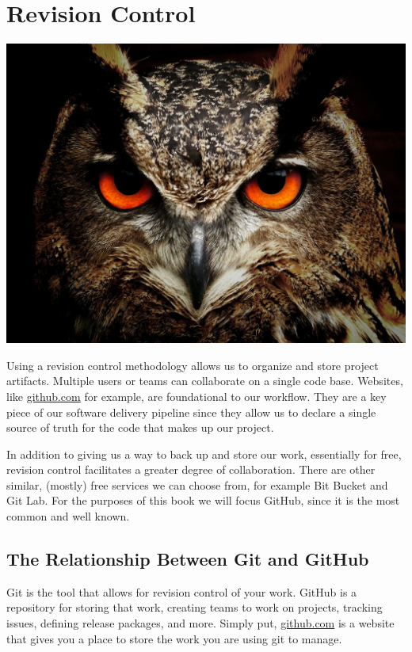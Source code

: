 \chapter{Revision Control}
\includegraphics[scale=0.20]{images/owl-50267_1920.jpg}

\justify{}
Using a revision control methodology allows us to organize and store project artifacts. Multiple users or
teams can collaborate on a single code base. Websites, like \href{https://github.com}{github.com} for example, are foundational to our workflow. They are a key piece of 
our software delivery pipeline since they allow us to declare a single source of truth for the code that makes up our project.

\justify{}
In addition to giving us a way to back up and store our work, essentially for free, revision control facilitates a greater degree
of collaboration. There are other similar, (mostly) free services we can choose from, for example Bit Bucket and Git
Lab. For the purposes of this book we will focus GitHub, since it is the most common and well known.

\section{The Relationship Between Git and GitHub}

\justify{}
Git is the tool that allows for revision control of your work. GitHub is a repository for storing that work, creating teams to work on projects, tracking issues, defining release packages,
and more. Simply put, \href{github.com}{github.com} is a website that gives you a place to store the work you are using git to manage. 

